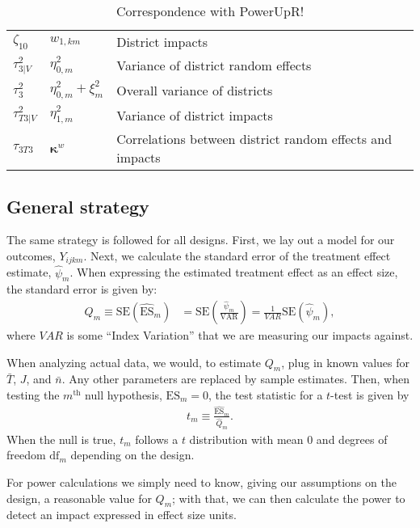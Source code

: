 \documentclass[12pt]{article}
\begin{document}
\begin{table}[p]
\begin{tabular}{l | l | l}
$\zeta_{10}$		& $w_{1,km}$					& District impacts\\
$\tau^2_{3|V}$		& $\eta^2_{0,m}$					& Variance of district random effects \\
$\tau^2_{3}$		& $\eta^2_{0,m} + \xi_{m}^2$		& Overall variance of districts\\
$\tau^2_{T3|V}$		& $\eta^2_{1,m}$					& Variance of district impacts\\
$\tau_{3T3}$		& $\boldsymbol{\kappa}^{w}$ 		& Correlations between district random effects and impacts \\
\end{tabular}
\caption{Correspondence with PowerUpR!\label{tab:powerup}}
\end{table}



\newpage
\subsection{General strategy}

The same strategy is followed for all designs.
First, we lay out a model for our outcomes, $Y_{ijkm}$.
Next, we calculate the standard error of the treatment effect estimate, $\hat{\psi}_m$.
When expressing the estimated treatment effect as an effect size, the standard error is given by:
\begin{align}\label{eqn:qm}
Q_m \equiv \text{SE}\left(\hat{\text{ES}}_m\right) &= \text{SE}\left(\frac{\hat{\psi}_m}{\mbox{VAR}}\right) = \frac{1}{VAR} \text{SE}\left(\hat{\psi}_m\right),
\end{align}
where $VAR$ is some ``Index Variation'' that we are measuring our impacts against.

When analyzing actual data, we would, to estimate $Q_m$, plug in known values for $\bar{T}$, $J$, and $\bar{n}$.
Any other parameters are replaced by sample estimates.
Then, when testing the $m^{\text{th}}$ null hypothesis, $\text{ES}_m = 0$, the test statistic for a $t$-test is given by
\begin{align}t_m \equiv \frac{\hat{\text{ES}}_m}{\hat{Q}_m}.\end{align}
When the null is true, $t_m$ follows a $t$ distribution with mean $0$ and degrees of freedom $\text{df}_m$ depending on the design.

For power calculations we simply need to know, giving our assumptions on the design, a reasonable value for $Q_m$; with that, we can then calculate the power to detect an impact expressed in effect size units.
\end{document}
